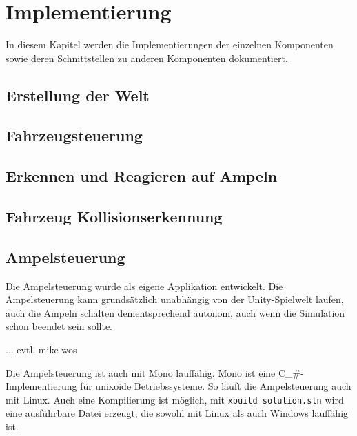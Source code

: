 
\chapter{Implementierung}
\label{Implementierung}

In diesem Kapitel werden die Implementierungen der einzelnen Komponenten sowie deren Schnittstellen zu anderen Komponenten dokumentiert.

\thispagestyle{standard}
\pagestyle{standard}

\section{Erstellung der Welt}
\label{Erstellung der Welt}

\section{Fahrzeugsteuerung}
\label{Fahrzeugsteuerung}

\section{Erkennen und Reagieren auf Ampeln}
\label{Erkennen und Reagieren auf Ampeln}

\section{Fahrzeug Kollisionserkennung}
\label{Fahrzeug Kollisionserkennung}

\section{Ampelsteuerung}
\label{Ampelsteuerung}

Die Ampelsteuerung wurde als eigene Applikation entwickelt. Die Ampelsteuerung kann grundsätzlich unabhängig von der Unity-Spielwelt laufen, auch die Ampeln schalten dementsprechend autonom, auch wenn die Simulation schon beendet sein sollte.

... evtl. mike wos


Die Ampelsteuerung ist auch mit Mono lauffähig. Mono ist eine C_#-Implementierung für unixoide Betriebssysteme. So läuft die Ampelsteuerung auch mit Linux. Auch eine Kompilierung ist möglich, mit \texttt{xbuild solution.sln} wird eine ausführbare Datei erzeugt, die sowohl mit Linux als auch Windows lauffähig ist.

